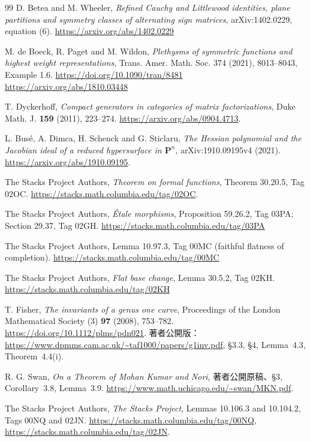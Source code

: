 \documentclass[a4paper,11pt]{ltjsarticle}
\theoremstyle{definition}
\begin{document}
\begin{thebibliography}{99}
D. Betea and M. Wheeler,
\emph{Refined Cauchy and Littlewood identities, plane partitions and
symmetry classes of alternating sign matrices}, arXiv:1402.0229, equation (6).
\url{https://arxiv.org/abs/1402.0229}

M. de Boeck, R. Paget and M. Wildon,
\emph{Plethysms of symmetric functions and highest weight representations},
Trans. Amer. Math. Soc. 374 (2021), 8013--8043, Example 1.6.
\url{https://doi.org/10.1090/tran/8481}
\url{https://arxiv.org/abs/1810.03448}


T. Dyckerhoff,
\emph{Compact generators in categories of matrix factorizations},
Duke Math. J. \textbf{159} (2011), 223--274.
\url{https://arxiv.org/abs/0904.4713}.

L. Bus\'e, A. Dimca, H. Schenck and G. Sticlaru,
\emph{The Hessian polynomial and the Jacobian ideal of a reduced
hypersurface in $\mathbf P^n$}, arXiv:1910.09195v4 (2021).
\url{https://arxiv.org/abs/1910.09195}.

The Stacks Project Authors,
\emph{Theorem on formal functions}, Theorem 30.20.5, Tag 02OC.
\url{https://stacks.math.columbia.edu/tag/02OC}.


The Stacks Project Authors,
\emph{\'Etale morphisms}, Proposition 59.26.2, Tag 03PA;
Section 29.37, Tag 02GH.
\url{https://stacks.math.columbia.edu/tag/03PA}

The Stacks Project Authors,
Lemma 10.97.3, Tag 00MC (faithful flatness of completion).
\url{https://stacks.math.columbia.edu/tag/00MC}

The Stacks Project Authors,
\emph{Flat base change}, Lemma 30.5.2, Tag 02KH.
\url{https://stacks.math.columbia.edu/tag/02KH}

T. Fisher,
\emph{The invariants of a genus one curve},
Proceedings of the London Mathematical Society (3) \textbf{97} (2008), 753--782.
\url{https://doi.org/10.1112/plms/pdn021}.
著者公開版：\url{https://www.dpmms.cam.ac.uk/~taf1000/papers/g1inv.pdf},
\S3.3, \S4, Lemma~4.3, Theorem~4.4(i).

R. G. Swan,
\emph{On a Theorem of Mohan Kumar and Nori},
著者公開原稿、\S3, Corollary~3.8, Lemma~3.9.
\url{https://www.math.uchicago.edu/~swan/MKN.pdf}.

The Stacks Project Authors,
\emph{The Stacks Project},
Lemmas 10.106.3 and 10.104.2, Tags 00NQ and 02JN.
\url{https://stacks.math.columbia.edu/tag/00NQ},
\url{https://stacks.math.columbia.edu/tag/02JN}.


\end{thebibliography}
\end{document}
